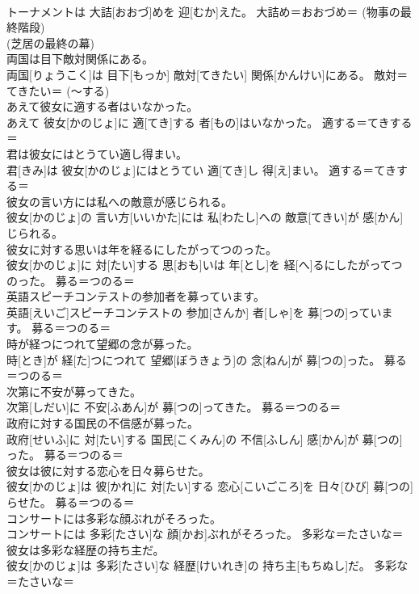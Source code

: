 \documentclass[8pt]{extreport}
\begin{document}
\begin{CJK}{UTF8}{min}
{\\	トーナメントは 大詰[おおづ]めを 迎[むか]えた。	大詰め＝おおづめ＝ (物事の最終階段) 
\\	(芝居の最終の幕) 
\\	両国は目下敵対関係にある。	
\\	両国[りょうこく]は 目下[もっか] 敵対[てきたい] 関係[かんけい]にある。	敵対＝てきたい＝ (〜する) 
\\	あえて彼女に適する者はいなかった。	
\\	あえて 彼女[かのじょ]に 適[てき]する 者[もの]はいなかった。	適する＝てきする＝ 
\\	君は彼女にはとうてい適し得まい。	
\\	君[きみ]は 彼女[かのじょ]にはとうてい 適[てき]し 得[え]まい。	適する＝てきする＝ 
\\	彼女の言い方には私への敵意が感じられる。	
\\	彼女[かのじょ]の 言い方[いいかた]には 私[わたし]への 敵意[てきい]が 感[かん]じられる。	
\\	彼女に対する思いは年を経るにしたがってつのった。	
\\	彼女[かのじょ]に 対[たい]する 思[おも]いは 年[とし]を 経[へ]るにしたがってつのった。	募る＝つのる＝ 
\\	英語スピーチコンテストの参加者を募っています。	
\\	英語[えいご]スピーチコンテストの 参加[さんか] 者[しゃ]を 募[つの]っています。	募る＝つのる＝ 
\\	時が経つにつれて望郷の念が募った。	
\\	時[とき]が 経[た]つにつれて 望郷[ぼうきょう]の 念[ねん]が 募[つの]った。	募る＝つのる＝ 
\\	次第に不安が募ってきた。	
\\	次第[しだい]に 不安[ふあん]が 募[つの]ってきた。	募る＝つのる＝ 
\\	政府に対する国民の不信感が募った。	
\\	政府[せいふ]に 対[たい]する 国民[こくみん]の 不信[ふしん] 感[かん]が 募[つの]った。	募る＝つのる＝ 
\\	彼女は彼に対する恋心を日々募らせた。	
\\	彼女[かのじょ]は 彼[かれ]に 対[たい]する 恋心[こいごころ]を 日々[ひび] 募[つの]らせた。	募る＝つのる＝ 
\\	コンサートには多彩な顔ぶれがそろった。	
\\	コンサートには 多彩[たさい]な 顔[かお]ぶれがそろった。	多彩な＝たさいな＝ 
\\	彼女は多彩な経歴の持ち主だ。	
\\	彼女[かのじょ]は 多彩[たさい]な 経歴[けいれき]の 持ち主[もちぬし]だ。	多彩な＝たさいな＝ 
}
\end{CJK}
\end{document}
